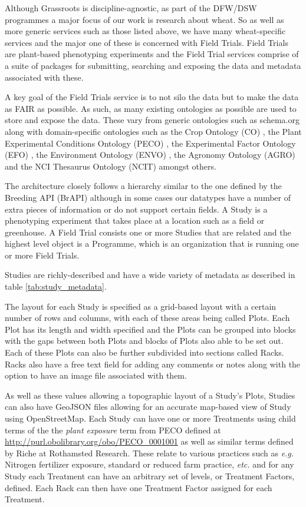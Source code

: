 \documentclass[12pt,a4paper]{extarticle}
\begin{document}
Although Grassroots is discipline-agnostic, as part of the DFW/DSW programmes a major focus of our work is research about wheat. 
So as well as more generic services such as those listed above, we have many wheat-specific services and the major one of these is concerned with Field Trials.
Field Trials are plant-based phenotyping experiments and the Field Trial services comprise of a suite of packages for submitting, searching and exposing the data and metadata associated with these. 

A key goal of the Field Trials service is to not silo the data but to make the data as FAIR\cite{fair_data} as possible. 
As such, as many existing ontologies as possible are used to store and expose the data. 
These vary from generic ontologies such as schema.org along with domain-specific ontologies such as the Crop Ontology (CO) \cite{co}, the Plant Experimental Conditions Ontology (PECO) \cite{peco}, the Experimental Factor Ontology (EFO) \cite{efo}, the Environment Ontology (ENVO) \cite{envo}, the Agronomy Ontology (AGRO) \cite{agro} and the NCI Thesaurus Ontology (NCIT) \cite{ncit} amongst others. 

The architecture closely follows a hierarchy similar to the one defined by the Breeding API (BrAPI) \cite{brapi} although in some cases our datatypes have a number of extra pieces of information or do not support certain fields. 
A Study is a phenotyping experiment that takes place at a location such as a field or greenhouse. 
A Field Trial consists one or more Studies that are related and the highest level object is a Programme, which is an organization that is running one or more Field Trials. 

Studies are richly-described and have a wide variety of metadata as described in table \ref{tab:study_metadata}.

The layout for each Study is specified as a grid-based layout with a certain number of rows and columns, with each of these areas being called Plots. 
Each Plot has its length and width specified and the Plots can be grouped into blocks with the gaps between both Plots and blocks of Plots also able to be set out. 
Each of these Plots can also be further subdivided into sections called Racks.
Racks also have a free text field for adding any comments or notes along with the option to have an image file associated with them.

As well as these values allowing a topographic layout of a Study's Plots, Studies can also have GeoJSON files allowing for an accurate map-based view of Study using OpenStreetMap.
Each Study can have one or more Treatments using child terms of the the \textit{plant exposure} term from PECO defined at \url{http://purl.obolibrary.org/obo/PECO_0001001} as well as similar terms defined by Riche at Rothamsted Research. 
These relate to various practices such as \textit{e.g.} Nitrogen fertilizer exposure, standard or reduced farm practice, \textit{etc.} and for any Study each Treatment can have an arbitrary set of levels, or Treatment Factors, defined. 
Each Rack can then have one Treatment Factor assigned for each Treatment.
\end{document}
